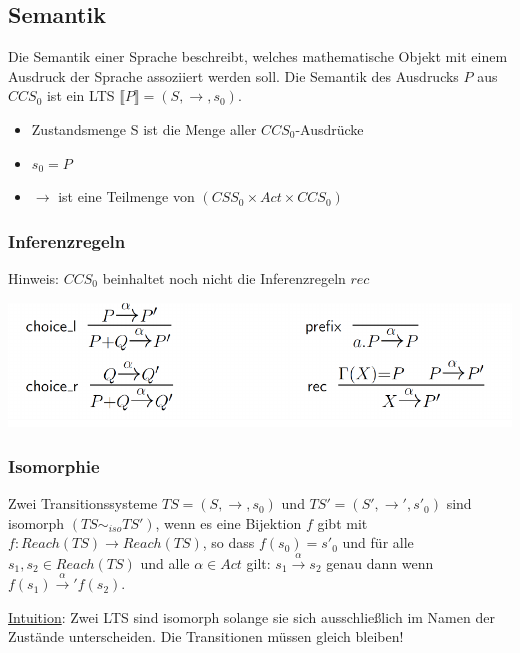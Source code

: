 \documentclass[a4paper,10pt, oneside]{book}
\begin{document}
\subsection{Semantik}
Die Semantik einer Sprache beschreibt, welches mathematische Objekt mit einem Ausdruck der Sprache assoziiert werden soll. Die Semantik des Ausdrucks $P$ aus $CCS_0$ ist ein LTS $\llbracket P \rrbracket = (S, \rightarrow, s_0)$.
\begin{itemize}
 \item Zustandsmenge S ist die Menge aller $CCS_0$-Ausdrücke
 \item $s_0 = P$
 \item $\longrightarrow$ ist eine Teilmenge von $(CSS_0 \times Act \times CCS_0)$
\end{itemize}

\subsubsection{Inferenzregeln}
\begin{flushleft}
Hinweis: $CCS_0$ beinhaltet noch nicht die Inferenzregeln $rec$
\end{flushleft}
\begin{center}
\includegraphics[scale=0.4]{inferenzregeln}
\end{center}

\subsubsection{Isomorphie}
Zwei Transitionssysteme $TS = (S,\rightarrow, s_0)$ und $TS' = (S', \rightarrow', s'_0)$ sind isomorph $(TS \sim_{iso} TS')$, wenn es eine Bijektion $f$ gibt mit $f: Reach(TS) \rightarrow Reach(TS)$, so dass $f(s_0) = s'_0$ und für alle $s_1, s_2 \in Reach(TS)$ und alle $\alpha \in Act$ gilt: $s_1 \xrightarrow{\alpha} s_2 $ genau dann wenn $f(s_1) \xrightarrow{\alpha}' f(s_2) $.\\
\begin{flushleft}
\underline{Intuition}: Zwei LTS sind isomorph solange sie sich ausschließlich im Namen der Zustände unterscheiden. Die Transitionen müssen gleich bleiben!
\end{flushleft}
\end{document}
